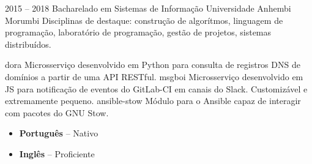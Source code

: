 \documentclass[9pt]{developercv} %
\begin{document}

\begin{entrylist}
	\entry
		{2015 -- 2018}
		{Bacharelado em Sistemas de Informação}
		{Universidade Anhembi Morumbi}
		{
            Disciplinas de destaque: construção de algorítmos, linguagem de
            programação, laboratório de programação, gestão de projetos, sistemas
            distribuídos.
        }
\end{entrylist}



\begin{minipage}[t]{0.7\textwidth}
	\vspace{-\baselineskip} %

    \begin{listf}
        \itemf
            {dora}
            {{\gituser}}
            {
                Microsserviço desenvolvido em Python para consulta de registros
                DNS de domínios a partir de uma API RESTful.
            }
        \itemf
            {msgboi}
            {{\gituser}}
            {
                Microsserviço desenvolvido em JS para notificação de eventos do
                GitLab-CI em canais do Slack. Customizável e extremamente
                pequeno.
            }
        \itemf
            {ansible-stow}
            {{\gituser}}
            {
                Módulo para o Ansible capaz de interagir com pacotes do GNU
                Stow.
            }
    \end{listf}
\end{minipage}
\hfill
\begin{minipage}[t]{0.2\textwidth}
	\vspace{-\baselineskip} %


    \begin{itemize}[leftmargin=0.5cm, topsep=0cm]
        \item \textbf{Português} -- Nativo
        \item \textbf{Inglês} -- Proficiente
    \end{itemize}
\end{minipage}

\end{document}
